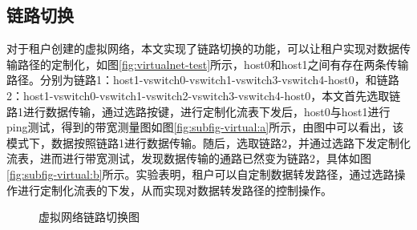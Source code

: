 \subsection{链路切换}
对于租户创建的虚拟网络，本文实现了链路切换的功能，可以让租户实现对数据传输路径的定制化，如图\ref{fig:virtualnet-test}所示，host0和host1之间有存在两条传输路径。分别为链路1：host1-vswitch0-vswitch1-vswitch3-vswitch4-host0，和链路2：host1-vswitch0-vswitch1-vswitch2-vswitch3-vswitch4-host0，本文首先选取链路1进行数据传输，通过选路按键，进行定制化流表下发后，host0与host1进行ping测试，得到的带宽测量图如图\ref{fig:subfig-virtual:a}所示，由图中可以看出，该模式下，数据按照链路1进行数据传输。随后，选取链路2，并通过选路下发定制化流表，进而进行带宽测试，发现数据传输的通路已然变为链路2，具体如图\ref{fig:subfig-virtual:b}所示。实验表明，租户可以自定制数据转发路径，通过选路操作进行定制化流表的下发，从而实现对数据转发路径的控制操作。

\begin{figure}[!htb]
 \centering
 \caption{虚拟网络链路切换图}
 \label{fig:customlink} %
\end{figure}
